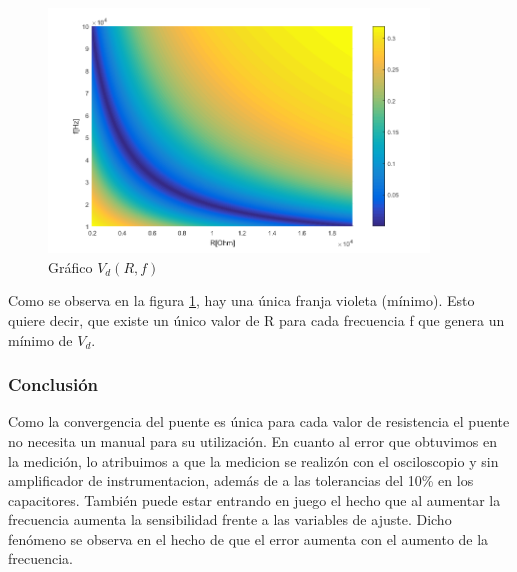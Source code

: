\documentclass[../../main.tex]{subfiles}
\begin{document}
\begin{figure}[H]	
	\centering
	\includegraphics[width=0.9\textwidth]{fotos/conv.png}
	\caption{Gr\'afico $V_d(R,f)$}\label{fig:convw}
\end{figure}

Como se observa en la figura \ref{fig:convw}, hay una \'unica franja violeta (m\'inimo). Esto quiere decir, que existe un \'unico valor de R para cada frecuencia f que genera un m\'inimo de $V_d$.

\subsubsection{Conclusión}
Como la convergencia del puente es \'unica para cada valor de resistencia el puente no necesita un manual para su utilizaci\'on. En cuanto al error que obtuvimos en la medici\'on, lo atribuimos a que la medicion se realizón con el osciloscopio y sin amplificador de instrumentacion, adem\'as de a las tolerancias del 10\% en los capacitores. Tambi\'en puede estar entrando en juego el hecho que al aumentar la frecuencia aumenta la sensibilidad frente a las variables de ajuste. Dicho fen\'omeno se observa en el hecho de que el error aumenta con el aumento de la frecuencia.
\end{document}
